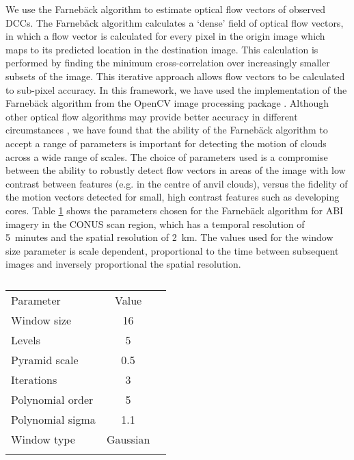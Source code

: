 We use the Farnebäck algorithm \citep{farneback_two-frame_2003} to estimate optical flow vectors of observed DCCs.
The Farnebäck algorithm calculates a `dense' field of optical flow vectors, in which a flow vector is calculated for every pixel in the origin image which maps to its predicted location in the destination image.
This calculation is performed by finding the minimum cross-correlation over increasingly smaller subsets of the image.
This iterative approach allows flow vectors to be calculated to sub-pixel accuracy.
In this framework, we have used the implementation of the Farnebäck algorithm from the OpenCV image processing package \citep{opencv_library}.
Although other optical flow algorithms may provide better accuracy in different circumstances \citep{baker_database_2011}, we have found that the ability of the Farnebäck algorithm to accept a range of parameters is important for detecting the motion of clouds across a wide range of scales.
The choice of parameters used is a compromise between the ability to robustly detect flow vectors in areas of the image with low contrast between features (e.g. in the centre of anvil clouds), versus the fidelity of the motion vectors detected for small, high contrast features such as developing cores.
Table \ref{table:parameters} shows the parameters chosen for the Farnebäck algorithm for ABI imagery in the CONUS scan region, which has a temporal resolution of 5~minutes and the spatial resolution of 2~km.
The values used for the window size parameter is scale dependent, proportional to the time between subsequent images and inversely proportional the spatial resolution.
\begin{table}[t]
\caption{}
\label{table:parameters}
\begin{tabular}{lcr}
\tophline
Parameter        & Value    \\ 
\middlehline
Window size      & 16       \\
Levels           & 5        \\
Pyramid scale    & 0.5      \\
Iterations       & 3        \\
Polynomial order & 5        \\
Polynomial sigma & 1.1      \\
Window type      & Gaussian \\
\bottomhline
\end{tabular}
\end{table}

